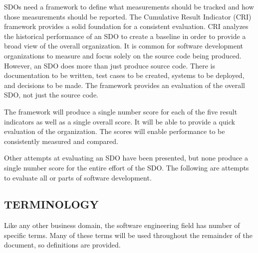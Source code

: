 \documentclass[SDSUThesis.tex]{subfiles}
\begin{document}
    SDOs need a framework to define
    what measurements should be tracked and how those measurements
    should be reported.  The Cumulative Result Indicator (CRI)
    framework provides a solid foundation
    for a consistent evaluation.  CRI analyzes the historical performance
    of an SDO
    to create a baseline in order to provide a broad
    view of the overall organization.  It is common for software development
    organizations to measure and focus solely on the source code
    being produced.  However, an SDO does more
    than just produce source code.  There is documentation to be
    written, test cases to be created, systems to be deployed, and
    decisions to be made.  The framework provides an evaluation
    of the overall SDO, not just the
    source code.
    
    The framework will produce a single number score for each of 
    the five result indicators as well as a single overall score.  
    It will be able to provide a quick evaluation of the organization.
    The scores will enable performance to be consistently measured
    and compared.

    Other attempts at evaluating an SDO
    have been presented, but none produce a single number score for
    the entire effort of the SDO. 
    The following are attempts to evaluate all or parts of 
    software development.


\subsection{TERMINOLOGY}
    Like any other business domain, the software engineering field has number
    of specific terms.  Many of these terms will be used throughout the remainder
    of the document, so definitions are provided.  
\end{document}
